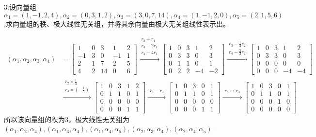 \documentclass{article}
\begin{document}
3.设向量组$\alpha_{1}=(1,-1,2,4),\alpha_{2}=(0,3,1,2),\alpha_{3}=(3,0,7,14),\alpha_{4}=(1,-1,2,0),\alpha_{5}=(2,1,5,6)$,求向量组的秩、极大线性无关组，并将其余向量由极大无关组线性表示出。

\begin{jie}
\begin{align*}
(\alpha_1,\alpha_2,\alpha_3,\alpha_4)&=
\begin{bmatrix}
  1 & 0 & 3 &1 &2\\
  -1 & 3 & 0&-1&1\\
  2 & 1 & 7&2&5\\
  4 & 2 &14&0&6
\end{bmatrix}
\xrightarrow{\substack{r_{2}+r_{1}\\ r_3-2r_1 \\ r_4-4r_1}}
{
\begin{bmatrix}
  1 & 0 & 3 &1&2\\
  0 & 3 & 3&0&3\\
  0 & 1 & 1&0&1\\
  0 & 2 &2&-4&-2
\end{bmatrix}
}
\xrightarrow{\substack{ r_3-\frac{1}{3}r_2 \\ r_4-\frac{2}{3}r_2}}
{
\begin{bmatrix}
  1 & 0 & 3 &1&2\\
  0 & 3 & 3&0&3\\
  0 & 0 & 0&0&0\\
  0 & 0 &0&-4&-4
\end{bmatrix}
}\\
&
\xrightarrow{\substack{ r_2\times\frac{1}{3} \\ r_4\times\left(-\frac{1}{4}\right)}}
{
\begin{bmatrix}
  1 & 0 & 3 &1&2\\
  0 & 1 & 1&0&1\\
  0 & 0 & 0&0&0\\
  0 & 0 &0&1&1
\end{bmatrix}
}
\xrightarrow{\substack{ r_1-r_4}}
{
\begin{bmatrix}
  1 & 0 & 3 &0&1\\
  0 & 1 & 1&0&1\\
  0 & 0 & 0&0&0\\
  0 & 0 &0&1&1
\end{bmatrix}
}
\xrightarrow{\substack{ r_3\leftrightarrow r_4}}
{
\begin{bmatrix}
  1 & 0 & 3 &0&1\\
  0 & 1 & 1&0&1\\
  0 & 0 & 0&1& 0\\
  0 & 0 &0&0& 0
\end{bmatrix}
}
\end{align*}
所以该向量组的秩为$3$，极大线性无关组为$(\alpha_1,\alpha_2,\alpha_4),(\alpha_1,\alpha_3,\alpha_4),(\alpha_1,\alpha_4,\alpha_5),(\alpha_2,\alpha_3,\alpha_4),(\alpha_2,\alpha_4,\alpha_5)$.


\end{jie}
\end{document}
